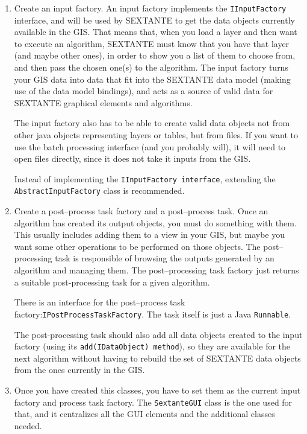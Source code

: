 \begin{enumerate}
\item Create an input factory. An input factory implements the \texttt{IInputFactory} interface, and will be used by SEXTANTE to get the data objects currently available in the GIS. That means that, when you load a layer and then want to execute an algorithm, SEXTANTE must know that you have that layer (and maybe other ones), in order to show you a list of them to choose from, and then pass the chosen one(s) to the algorithm. The input factory turns your GIS data into data that fit into the SEXTANTE data model (making use of the data model bindings), and acts as a source of valid data for SEXTANTE graphical elements and algorithms.

The input factory also has to be able to create valid data objects not from other java objects representing layers or tables, but from files. If you want to use the batch processing interface (and you probably will), it will need to open files directly, since it does not take it inputs from the GIS.

Instead of implementing the \texttt{IInputFactory interface}, extending the \texttt{AbstractInputFactory} class is recommended.

\item Create a post--process task factory and a post--process task. Once an algorithm has created its output objects, you must do something with them. This usually includes adding them to a view in your GIS, but maybe you want some other operations to be performed on those objects. The post--processing task is responsible of browsing the outputs generated by an algorithm and managing them. The post--processing task factory just returns a suitable post-processing task for a given algorithm.

There is an interface for the post--process task factory:\texttt{IPostProcessTaskFactory}. The task itself is just a Java \texttt{Runnable}.

The post-processing task should also add all data objects created to the input factory (using its \texttt{add(IDataObject) method}), so they are available for the next algorithm without having to rebuild the set of SEXTANTE data objects from the ones currently in the GIS.

\item Once you have created this classes, you have to set them as the current input factory and process task factory. The \texttt{SextanteGUI} class is the one used for that, and it centralizes all the GUI elements and the additional classes needed.


\end{enumerate}
